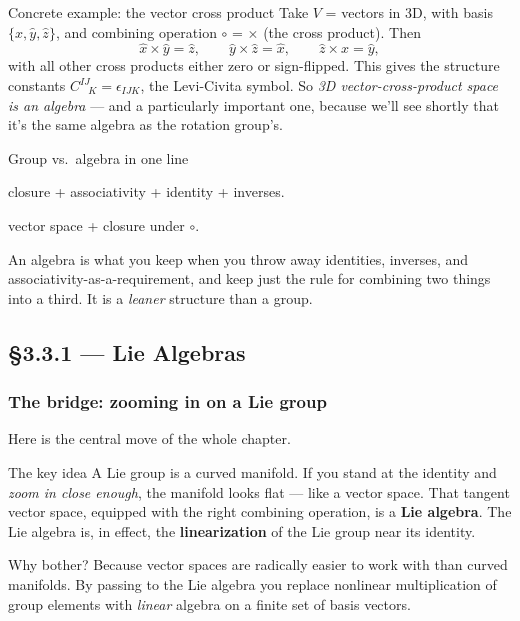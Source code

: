 \documentclass[11pt]{article}
\begin{document}
\begin{examplebox}{Concrete example: the vector cross product}
Take $V$ = vectors in 3D, with basis $\{\hat x, \hat y, \hat z\}$, and
combining operation $\circ$ = $\times$ (the cross product). Then
\[
  \hat x \times \hat y = \hat z, \qquad
  \hat y \times \hat z = \hat x, \qquad
  \hat z \times \hat x = \hat y,
\]
with all other cross products either zero or sign-flipped. This gives
the structure constants $C^{IJ}_{\;\;\;K} = \epsilon_{IJK}$, the
Levi-Civita symbol. So \emph{3D vector-cross-product space is an
algebra} --- and a particularly important one, because we'll see
shortly that it's the same algebra as the rotation group's.
\end{examplebox}

\begin{intuitionbox}{Group vs.\ algebra in one line}
\begin{description}[style=nextline, leftmargin=0pt, itemsep=3pt]
  \item[\textbf{Group:}] closure + associativity + identity + inverses.
  \item[\textbf{Algebra:}] vector space + closure under $\circ$.
\end{description}
An algebra is what you keep when you throw away identities, inverses,
and associativity-as-a-requirement, and keep just the rule for combining
two things into a third. It is a \emph{leaner} structure than a group.
\end{intuitionbox}

\subsection*{\S3.3.1 --- Lie Algebras}

\subsubsection*{The bridge: zooming in on a Lie group}

Here is the central move of the whole chapter.

\begin{intuitionbox}{The key idea}
A Lie group is a curved manifold. If you stand at the identity and
\emph{zoom in close enough}, the manifold looks flat --- like a vector
space. That tangent vector space, equipped with the right combining
operation, is a \textbf{Lie algebra}. The Lie algebra is, in effect,
the \textbf{linearization} of the Lie group near its identity.

Why bother? Because vector spaces are radically easier to work with than
curved manifolds. By passing to the Lie algebra you replace nonlinear
multiplication of group elements with \emph{linear} algebra on a finite
set of basis vectors.
\end{intuitionbox}
\end{document}
